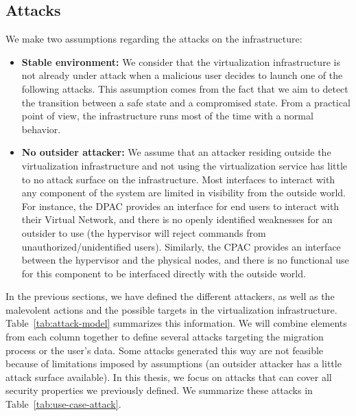 \subsection{Attacks}
\label{sec:model-attacks}
We make two assumptions regarding the attacks on the infrastructure:

\begin{itemize}
    \item \textbf{Stable environment: } We consider that the virtualization infrastructure is not already under attack when a malicious user decides to launch one of the following attacks.
This assumption comes from the fact that we aim to detect the transition between a safe state and a compromised state. From a practical point of view, the infrastructure runs most of the time with a normal behavior.

    \item \textbf{No outsider attacker: } We assume that an attacker residing outside the virtualization infrastructure and not using the virtualization service has little to no attack surface on the infrastructure.
Most interfaces to interact with any component of the system are limited in visibility from the outside world.
For instance, the DPAC provides an interface for end users to interact with their Virtual Network, and there is no openly identified weaknesses for an outsider to use (\ie the hypervisor will reject commands from unauthorized/unidentified users).
Similarly, the CPAC provides an interface between the hypervisor and the physical nodes, and there is no functional use for this component to be interfaced directly with the outside world.
\end{itemize}

In the previous sections, we have defined the different attackers, as well as the malevolent actions and the possible targets in the virtualization infrastructure. 
Table~\ref{tab:attack-model} summarizes this information.
We will combine elements from each column together to define several attacks targeting the migration process or the user's data.
Some attacks generated this way are not feasible because of limitations imposed by assumptions (\eg an outsider attacker has a little attack surface available).
In this thesis, we focus on attacks that can cover all security properties we previously defined.
We summarize these attacks in Table~\ref{tab:use-case-attack}.

